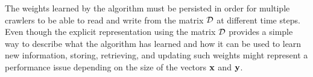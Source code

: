 The weights learned by the \mlblink algorithm must be persisted in order for multiple crawlers to be able to read and write from the matrix $\mathcal{D}$ at different time steps. Even though the explicit representation using the matrix $\mathcal{D}$ provides a simple way to describe what the algorithm has learned and how it can be used to learn new information, storing, retrieving, and updating such weights might represent a performance issue depending on the size of the vectors $\boldsymbol{\mathbf{x}}$ and $\boldsymbol{\mathbf{y}}$.